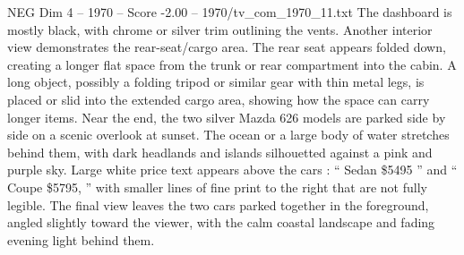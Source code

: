 \begin{textsample}{NEG Dim 4 – 1970 – Score -2.00 – 1970/tv\_com\_1970\_11.txt}
The dashboard is mostly black, with chrome or silver trim outlining the vents.
Another interior view demonstrates the rear-seat/cargo area.
The rear seat appears folded down, creating a longer flat space from the trunk or rear compartment into the cabin.
A long object, possibly a folding tripod or similar gear with thin metal legs, is placed or slid into the extended cargo area, showing how the space can carry longer items.
Near the end, the two silver Mazda 626 models are parked side by side on a scenic overlook at sunset.
The ocean or a large body of water stretches behind them, with dark headlands and islands silhouetted against a pink and purple sky.
Large white price text appears above the cars : “ Sedan \$5495 ” and “ Coupe \$5795, ” with smaller lines of fine print to the right that are not fully legible.
The final view leaves the two cars parked together in the foreground, angled slightly toward the viewer, with the calm coastal landscape and fading evening light behind them.

\end{textsample}
